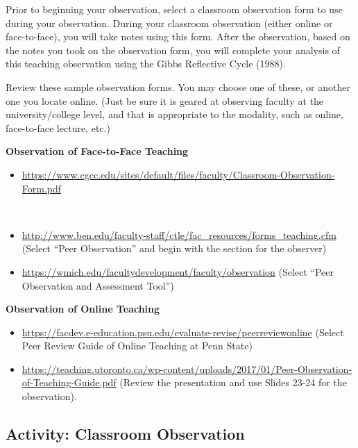 \documentclass[
]{book}
\providecommand{\tightlist}{%
  \setlength{\itemsep}{0pt}\setlength{\parskip}{0pt}}
\begin{document}
\begin{reflect}
Prior to beginning your observation, select a classroom observation form to use during your observation. During your classroom observation (either online or face-to-face), you will take notes using this form. After the observation, based on the notes you took on the observation form, you will complete your analysis of this teaching observation using the Gibbs Reflective Cycle (1988).

Review these sample observation forms. You may choose one of these, or another one you locate online. (Just be sure it is geared at observing faculty at the university/college level, and that is appropriate to the modality, such as online, face-to-face lecture, etc.)

\textbf{Observation of Face-to-Face Teaching}

\begin{itemize}
\tightlist
\item
  \url{https://www.cgcc.edu/sites/default/files/faculty/Classroom-Observation-Form.pdf}\strut \\
\item
  \url{http://www.ben.edu/faculty-staff/ctle/fac_resources/forms_teaching.cfm} (Select ``Peer Observation'' and begin with the section for the observer)\\
\item
  \url{https://wmich.edu/facultydevelopment/faculty/observation} (Select ``Peer Observation and Assessment Tool'')
\end{itemize}

\textbf{Observation of Online Teaching}

\begin{itemize}
\tightlist
\item
  \url{https://facdev.e-education.psu.edu/evaluate-revise/peerreviewonline} (Select Peer Review Guide of Online Teaching at Penn State)\\
\item
  \url{https://teaching.utoronto.ca/wp-content/uploads/2017/01/Peer-Observation-of-Teaching-Guide.pdf} (Review the presentation and use Slides 23-24 for the observation).
\end{itemize}
\end{reflect}

\hypertarget{activity-classroom-observation}{%
\subsection*{Activity: Classroom Observation}\label{activity-classroom-observation}}
\end{document}
